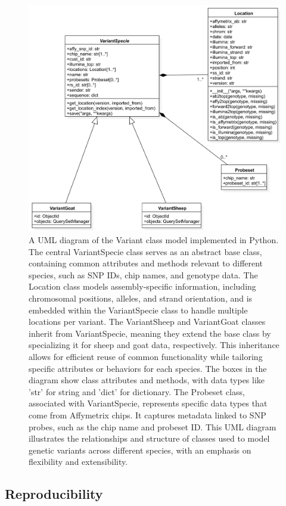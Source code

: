 \documentclass[a4paper,num-refs,gigabyte]{oup-contemporary}
\begin{document}
\begin{figure}%
\centering
\includegraphics[width=.7\textwidth]{VariantModel.png}
\caption{A UML diagram of the Variant class model implemented in Python. The central VariantSpecie class serves as an abstract base class, containing common attributes and methods relevant to different species, such as SNP IDs, chip names, and genotype data. The Location class models assembly-specific information, including chromosomal positions, alleles, and strand orientation, and is embedded within the VariantSpecie class to handle multiple locations per variant.
The VariantSheep and VariantGoat classes inherit from VariantSpecie, meaning they extend the base class by specializing it for sheep and goat data, respectively. This inheritance allows for efficient reuse of common functionality while tailoring specific attributes or behaviors for each species. The boxes in the diagram show class attributes and methods, with data types like 'str' for string and 'dict' for dictionary.
The Probeset class, associated with VariantSpecie, represents specific data types that come from Affymetrix chips. It captures metadata linked to SNP probes, such as the chip name and probeset ID. This UML diagram illustrates the relationships and structure of classes used to model genetic variants across different species, with an emphasis on flexibility and extensibility.}
\label{fig:variant_class_model}
\end{figure}

\subsection{Reproducibility}
\end{document}
